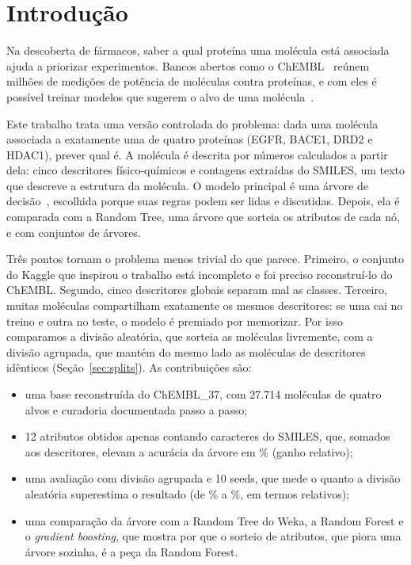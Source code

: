 \section{Introdução}

Na descoberta de fármacos, saber a qual proteína uma molécula está associada ajuda a priorizar experimentos. Bancos abertos como o ChEMBL~\cite{gaulton:12,zdrazil:24} reúnem milhões de medições de potência de moléculas contra proteínas, e com eles é possível treinar modelos que sugerem o alvo de uma molécula~\cite{keiser:07}.

Este trabalho trata uma versão controlada do problema: dada uma molécula associada a exatamente uma de quatro proteínas (EGFR, BACE1, DRD2 e HDAC1), prever qual é. A molécula é descrita por números calculados a partir dela: cinco descritores físico-químicos e contagens extraídas do SMILES, um texto que descreve a estrutura da molécula. O modelo principal é uma árvore de decisão~\cite{breiman:84}, escolhida porque suas regras podem ser lidas e discutidas. Depois, ela é comparada com a Random Tree, uma árvore que sorteia os atributos de cada nó, e com conjuntos de árvores.

Três pontos tornam o problema menos trivial do que parece. Primeiro, o conjunto do Kaggle que inspirou o trabalho está incompleto e foi preciso reconstruí-lo do ChEMBL. Segundo, cinco descritores globais separam mal as classes. Terceiro, muitas moléculas compartilham exatamente os mesmos descritores: se uma cai no treino e outra no teste, o modelo é premiado por memorizar. Por isso comparamos a divisão aleatória, que sorteia as moléculas livremente, com a divisão agrupada, que mantém do mesmo lado as moléculas de descritores idênticos (Seção~\ref{sec:splits}). As contribuições são:
\begin{itemize}
  \item uma base reconstruída do ChEMBL\_37, com 27.714 moléculas de quatro alvos e curadoria documentada passo a passo;
  \item 12 atributos obtidos apenas contando caracteres do SMILES, que, somados aos descritores, elevam a acurácia da árvore em \ganhoAmbos\% (ganho relativo);
  \item uma avaliação com divisão agrupada e 10 seeds, que mede o quanto a divisão aleatória superestima o resultado (de \gapMin\% a \gapMax\%, em termos relativos);
  \item uma comparação da árvore com a Random Tree do Weka, a Random Forest e o \emph{gradient boosting}, que mostra por que o sorteio de atributos, que piora uma árvore sozinha, é a peça da Random Forest.
\end{itemize}
